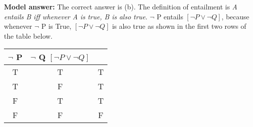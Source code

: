 \documentclass[a4,11pt]{article}
\begin{document}
\begin{enumerate}[leftmargin = 12pt]
{ \bf Model answer:}  The correct answer is (b). The definition of entailment is {\it A entails B iff whenever A is true, B is also true}. $\neg$ P entails $[ \neg P \lor \neg Q ]$, because whenever  $\neg$ P is True,  $[ \neg P \lor \neg Q ]$ is also true as shown in the first two rows of the table below.

\begin{tabular}{c | c | c }
\hline \hline
 $\neg$ P & $\neg$ Q $[ \neg P \lor \neg Q ]$  \\
\hline
T & T & T \\
T & F & T \\
F & T & T \\
F & F & F \\
\hline \hline
\end{tabular}

\end{enumerate}
\end{document}
